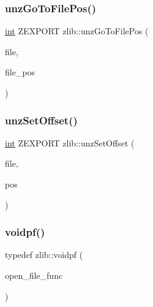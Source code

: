 \mbox{\label{namespacezlib_a8ba48b65e356243eb937bcbcebc7501d}} 
\subsubsection{\texorpdfstring{unz\+Go\+To\+File\+Pos()}{unzGoToFilePos()}}
{\footnotesize\ttfamily \hyperlink{namespacezlib_a0c9da18d93722fcf02a354ae2b6ec1ba}{int} Z\+E\+X\+P\+O\+RT zlib\+::unz\+Go\+To\+File\+Pos (\begin{DoxyParamCaption}\item[{\hyperlink{namespacezlib_a48c1eb530e72d2132ea9cb6648f4047e}{unz\+File}}]{file,  }\item[{\hyperlink{namespacezlib_aafe5edb16e400a11811c203048d2f464}{unz\+\_\+file\+\_\+pos} $\ast$}]{file\+\_\+pos }\end{DoxyParamCaption})}

\mbox{\label{namespacezlib_a576a94727964ae455a95b4565eb7c543}} 
\subsubsection{\texorpdfstring{unz\+Set\+Offset()}{unzSetOffset()}}
{\footnotesize\ttfamily \hyperlink{namespacezlib_a0c9da18d93722fcf02a354ae2b6ec1ba}{int} Z\+E\+X\+P\+O\+RT zlib\+::unz\+Set\+Offset (\begin{DoxyParamCaption}\item[{\hyperlink{namespacezlib_a48c1eb530e72d2132ea9cb6648f4047e}{unz\+File}}]{file,  }\item[{\hyperlink{namespacezlib_a3bc0123d9337acd75d286df79e6cf7da}{u\+Long}}]{pos }\end{DoxyParamCaption})}

\mbox{\label{namespacezlib_a2bc9778594c329ce309c43185bc3f9eb}} 
\subsubsection{\texorpdfstring{voidpf()}{voidpf()}}
{\footnotesize\ttfamily typedef zlib\+::voidpf (\begin{DoxyParamCaption}\item[{\hyperlink{ioapi_8h_aace96475a6dd2915bc55bc542d7aa8a5}{Z\+C\+A\+L\+L\+B\+A\+CK} $\ast$}]{open\+\_\+file\+\_\+func }\end{DoxyParamCaption})}

